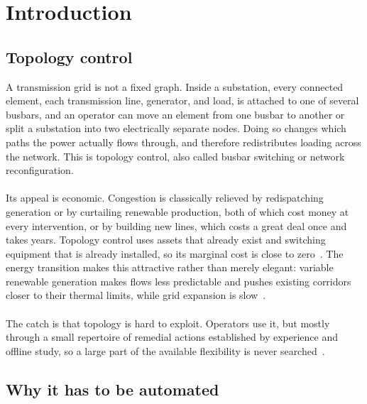 \chapter{Introduction}
\label{ch:introduction}

\section{Topology control}
\label{sec:intro-topology-control}

A transmission grid is not a fixed graph. Inside a substation, every connected
element, each transmission line, generator, and load, is attached to one of
several busbars, and an operator can move an element from one busbar to another
or split a substation into two electrically separate nodes. Doing so changes
which paths the power actually flows through, and therefore redistributes
loading across the network. This is topology control, also called busbar
switching or network reconfiguration.
\\
\\
Its appeal is economic. Congestion is classically relieved by redispatching
generation or by curtailing renewable production, both of which cost money at
every intervention, or by building new lines, which costs a great deal once and
takes years. Topology control uses assets that already exist and switching
equipment that is already installed, so its marginal cost is close to
zero~\cite{fisher2008ots}. The energy transition makes this attractive rather
than merely elegant: variable renewable generation makes flows less predictable
and pushes existing corridors closer to their thermal limits, while grid
expansion is slow~\cite{marot2021l2rpn,viebahn2022ai}.
\\
\\
The catch is that topology is hard to exploit. Operators use it, but mostly
through a small repertoire of remedial actions established by experience and
offline study, so a large part of the available flexibility is never
searched~\cite{viebahn2022ai}.

\section{Why it has to be automated}
\label{sec:intro-automation}

